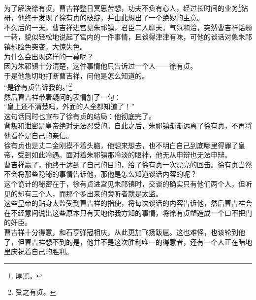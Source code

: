 \begin{multicols}{\theparacolNo}
为了解决徐有贞，曹吉祥整日冥思苦想，功夫不负有心人，经过长时间的业务\footnote{厚黑。}钻研，他终于发现了徐有贞的破绽，并由此想出了一个绝妙的主意。\\

不久后的一天，曹吉祥进宫见朱祁镇，君臣二人聊天，气氛和洽，突然曹吉祥话题一转，貌似轻松地说起了宫内的一件事情，且谈得津津有味，可他的谈话对象朱祁镇却脸色突变，大惊失色。\\

为什么会出现这样的一幕呢？\\

因为朱祁镇十分清楚，这件事情他只告诉过一个人——徐有贞。\\

于是他急切地打断曹吉祥，问他是怎么知道的。\\

“是徐有贞告诉我的。”\footnote{受之有贞。}\\

然后曹吉祥带着疑问的表情加了一句：\\

“皇上还不清楚吗，外面的人全都知道了！”\\

这句话同时也宣布了徐有贞的结局：他彻底完了。\\

背叛和泄密是皇帝绝对无法忍受的。自此之后，朱祁镇渐渐远离了徐有贞，不再将他看作是自己的亲信。\\

徐有贞也是丈二金刚摸不着头脑，他想来想去，也不明白自己到底哪里得罪了皇帝，受到如此冷遇。面对着朱祁镇那冷淡的眼神，他无从申辩也无法申辩。\\

曹吉祥赢了，他终于达到了自己的目的，给了徐有贞一次漂亮的回击。徐有贞当然不会将那些隐秘的事情告诉他，那他是怎么知道谈话内容的呢？\\

这个诡计的秘密在于，徐有贞进宫见朱祁镇时，交谈的确实只有他们两个人，但听见的却有三个人，而那个多出来的旁听者就是太监。\\

这些皇帝的贴身太监受到曹吉祥的指使，将每次谈话的内容告诉他，然后曹吉祥会在不经意间说出这些原本只有天地你我方知的事情，将徐有贞塑造成一个口不把门的奸臣。\\

曹吉祥十分得意，和石亨弹冠相庆，从此更加飞扬跋扈。这也难怪，也该轮到他了，但曹吉祥想不到的是，他并不是这次胜利唯一的得意者，还有一个人正在暗地里庆祝着自己的胜利。\\


\end{multicols}
